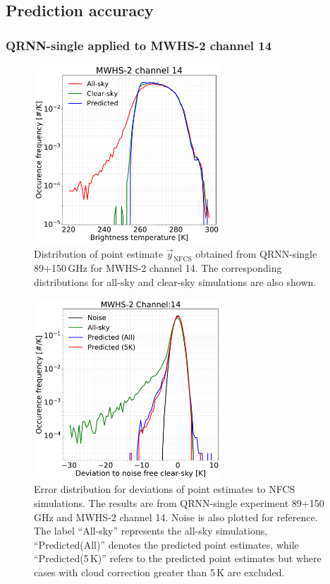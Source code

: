 \documentclass[amt, manuscript]{copernicus}
\newcommand{\ynfcs}{\vec{y}_\text{NFCS}}
\begin{document}
\subsection{Prediction accuracy}

\subsubsection{QRNN-single applied to MWHS-2 channel 14} 
\begin{figure}[t]
	\centering
	\includegraphics[width = 70mm]{Figures/QRNN_output_mwhs.pdf} 
	\caption{Distribution of point estimate $\ynfcs$ obtained from QRNN-single 89+150\,GHz for MWHS-2 channel 14. The corresponding distributions for all-sky and clear-sky simulations are also shown.}
	\label{fig:distribution_predicted_mwhs14}	
\end{figure}
\begin{figure}[t]
	\centering
	\includegraphics[width = 70mm]{Figures/MWHS_error_dist_14.pdf} 
	\caption{Error distribution for deviations of point estimates to NFCS simulations. The results are from QRNN-single experiment 89+150\,GHz and MWHS-2 channel 14. Noise is also plotted for reference. The label ``All-sky'' represents the all-sky simulations, ``Predicted(All)'' denotes the predicted point estimates, while ``Predicted(5\,K)'' refers to the predicted point estimates but where cases with cloud correction greater than 5\,K are excluded.}
	\label{fig:error_distribution_mwhs14}	
\end{figure}
\end{document}
